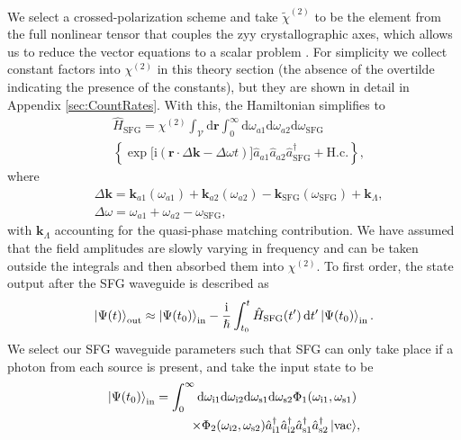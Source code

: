 \documentclass[twocolumn,amssymb, nobibnotes, showpacs, aps, pra,10pt]{revtex4-1}
\newcommand*{\aione}{\hat{a}_{\textrm{i}1}}
\newcommand*{\aitwo}{\hat{a}_{\textrm{i}2}}
\newcommand*{\asone}{\hat{a}_{\textrm{s}1}}
\newcommand*{\astwo}{\hat{a}_{\textrm{s}2}}
\newcommand*{\wione}{\omega_{\textrm{i}1}}
\newcommand*{\witwo}{\omega_{\textrm{i}2}}
\newcommand*{\wsone}{\omega_{\textrm{s}1}}
\newcommand*{\wstwo}{\omega_{\textrm{s}2}}
\newcommand*{\wsfg}{\omega_\textrm{SFG}}
\newcommand*{\vacuum}{\ket{\textrm{vac}}}
\newcommand*{\hc}{\textrm{H.c.}}
\newcommand*{\ii}{\mathrm{i}}
\begin{document}
We select a crossed-polarization scheme and take $\tilde{\chi}^{(2)}$ to be the element from the full nonlinear tensor that couples the zyy crystallographic axes, which allows us to reduce the vector equations to a scalar problem \cite{Bierlein}. For simplicity we collect constant factors into $\chi^{(2)}$ in this theory section (the absence of the overtilde indicating the presence of the constants), but they are shown in detail in Appendix \ref{sec:CountRates}.
 With this, the Hamiltonian simplifies to
\begin{equation} \label{eq:Hamiltonian}
\begin{split}
&\hat{H}_{\text{SFG}}=\chi^{(2)}\int_\mathcal{V}\text{d}\mathbf{r}\int_0^\infty \text{d}\omega_{a1} \text{d}\omega_{a2}\text{d}\wsfg \\
&\left\{ \exp\big[ \ii \left( \mathbf{r}\cdot \Delta \mathbf{k} - \Delta \omega t \right) \big] \hat{a}_{a1}\hat{a}_{a2}\hat{a}^\dagger_\text{SFG}+\hc\right\},
\end{split}
\end{equation}
where
\begin{align}
&\Delta \mathbf{k} = \mathbf{k}_{a1}(\omega_{a1})+\mathbf{k}_{a2}(\omega_{a2})-\mathbf{k}_\text{SFG}(\wsfg) + \mathbf{k}_\Lambda, \\
&\Delta \omega = \omega_{a1}+\omega_{a2}-\wsfg,
\end{align}
with $\mathbf{k}_\Lambda$ accounting for the quasi-phase matching contribution. We have assumed that the field amplitudes are slowly varying in frequency and can be taken outside the integrals and then absorbed them into $\chi^{(2)}$. To first order, the state output after the SFG waveguide is described as 
\begin{equation}
\ket{\Psi(t)}_\text{out} \approx \ket{\Psi(t_0)}_\text{in}-\frac{\ii}{\hslash} \int_{t_0}^t\hat{H}_\text{SFG}(t')\, \text{d}t'\ket{\Psi(t_0)}_\text{in}.\label{eq:outputState}
\end{equation}
We select our SFG waveguide parameters such that SFG can only take place if a photon from each source is present, and take the input state to be
\begin{equation}
\begin{split}
\ket{\Psi (t_0)}_\text{in}=\int_0^\infty \text{d}\wione\text{d}\witwo\text{d}\wsone\text{d}\wstwo\Phi_1(\wione,\wsone)& \\
  \times \Phi_2(\witwo,\wstwo) \aione^\dagger\aitwo^\dagger\asone^\dagger\astwo^\dagger \vacuum &, \label{eq:inputState}
\end{split}
\end{equation}
\end{document}
